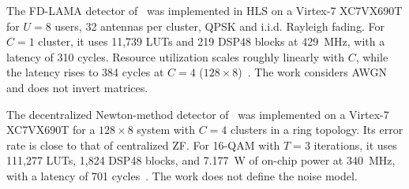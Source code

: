 The FD-LAMA detector of~\cite{li2019fdlama} was implemented in HLS on a
Virtex-7 XC7VX690T for $U = 8$ users, 32 antennas per cluster, QPSK and i.i.d. Rayleigh fading. For $C = 1$ cluster, it uses 11,739 LUTs and 219 DSP48 blocks at 429~MHz, with a latency of 310 cycles. Resource utilization scales roughly linearly with $C$,
while the latency rises to 384 cycles at
$C = 4$ ($128 \times 8$)~\cite{li2019fdlama}. The work considers AWGN and does not invert matrices.

The decentralized Newton-method detector of~\cite{kulkarni2021newton}
was implemented on a Virtex-7 XC7VX690T for a $128 \times 8$ system with
$C = 4$ clusters in a ring topology. Its error rate is close to that of centralized ZF. For 16-QAM with $T = 3$ iterations, it uses 111,277 LUTs,
1,824 DSP48 blocks, and 7.177~W of on-chip power at 340~MHz, with a latency of 701 cycles~\cite{kulkarni2021newton}. The work does not define the noise model.
